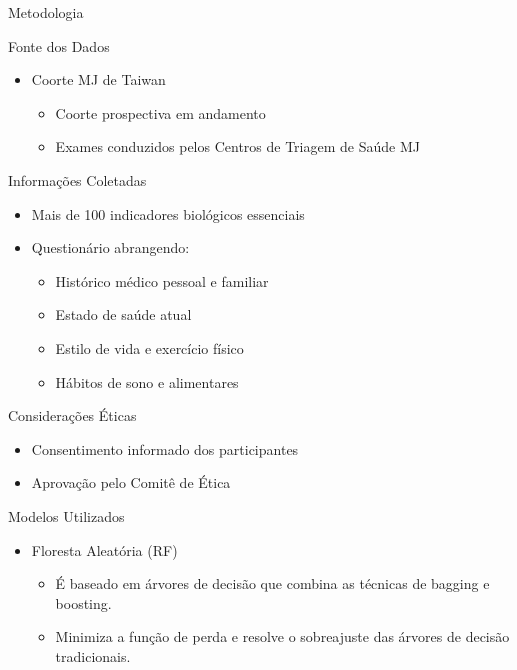 \begin{frame}{Metodologia}
\end{frame}
\begin{frame}{Fonte dos Dados}
	\begin{itemize}
		\item Coorte MJ de Taiwan  
		\begin{itemize}
			\item Coorte prospectiva em andamento  
			\item Exames conduzidos pelos Centros de Triagem de Saúde MJ  
		\end{itemize}
	\end{itemize}
\end{frame}

\begin{frame}{Informações Coletadas}
	\begin{itemize}
		\item Mais de 100 indicadores biológicos essenciais  
		\item Questionário abrangendo:  
		\begin{itemize}
			\item Histórico médico pessoal e familiar  
			\item Estado de saúde atual  
			\item Estilo de vida e exercício físico  
			\item Hábitos de sono e alimentares  
		\end{itemize}
	\end{itemize}
\end{frame}

\begin{frame}{Considerações Éticas}
	\begin{itemize}
		\item Consentimento informado dos participantes  
		\item Aprovação pelo Comitê de Ética
	\end{itemize}
\end{frame}

\begin{frame}{Modelos Utilizados}
	\begin{itemize}
		\item Floresta Aleatória (RF)
		\begin{itemize}
			\item É baseado em árvores de decisão que combina as técnicas de bagging e boosting.
			\item Minimiza a função de perda e resolve o sobreajuste das árvores de decisão tradicionais.
		\end{itemize}
	\end{itemize}
\end{frame}


